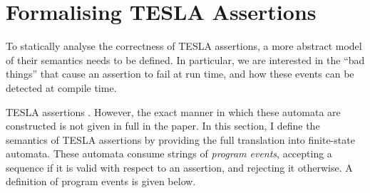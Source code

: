 



\section{Formalising TESLA Assertions} \label{sec:formal}

To statically analyse the correctness of TESLA assertions, a more abstract model
of their semantics needs to be defined. In particular, we are interested in the
``bad things'' that cause an assertion to fail at run time, and how these events
can be detected at compile time.

TESLA assertions . However, the exact manner in which these automata are constructed is
not given in full in the paper. In this section, I define the semantics of TESLA
assertions by providing the full translation into finite-state automata. These
automata consume strings of \emph{program events}, accepting a sequence if it is
valid with respect to an assertion, and rejecting it otherwise. A definition of
program events is given below.

